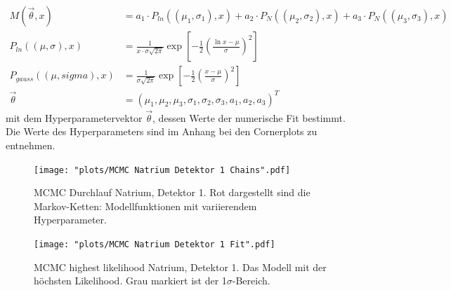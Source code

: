 \documentclass[%
aps,
onecolumn,
11pt,
tightenlines,
nofootinbib,
superscriptaddress,
floatfix,
prd,
]{revtex4-2}
\begin{document}
\begin{align}
	M(\vec{\theta}, x) &= a_1 \cdot P_{ln}((\mu_1,\sigma_1),x) + a_2 \cdot P_{N}((\mu_2,\sigma_2), x) + a_3 \cdot P_{N}((\mu_3,\sigma_3), x) \\
	P_{ln}((\mu,\sigma), x) &= \frac{1}{x \cdot \sigma \sqrt{2\pi}} \exp \left[ -\frac{1}{2} \left ( \frac{\ln x - \mu}{\sigma} \right )^2  \right] \\
    P_{gauss}((\mu,sigma), x) &= \frac{1}{\sigma \sqrt{2\pi}} \exp \left[ -\frac{1}{2} \left( \frac{x-\mu}{\sigma} \right)^2 \right ] \\
    \vec{\theta} &= (\mu_1, \mu_2, \mu_3, \sigma_1, \sigma_2, \sigma_3, a_1, a_2, a_3)^T
\end{align}
mit dem Hyperparametervektor $\vec\theta$, dessen Werte der numerische Fit bestimmt. Die Werte des Hyperparameters sind im Anhang bei den Cornerplots zu entnehmen. 
\begin{figure}[H]
	\centering
	\texttt{[image: "plots/MCMC Natrium Detektor 1 Chains".pdf]}
	\caption{MCMC Durchlauf Natrium, Detektor 1. Rot dargestellt sind die Markov-Ketten: Modellfunktionen mit variierendem Hyperparameter.}
\end{figure}

\begin{figure}[H]
	\centering
	\texttt{[image: "plots/MCMC Natrium Detektor 1 Fit".pdf]}
	\caption{MCMC highest likelihood Natrium, Detektor 1. Das Modell mit der höchsten Likelihood. Grau markiert ist der 1$\sigma$-Bereich.}
\end{figure}
\end{document}
